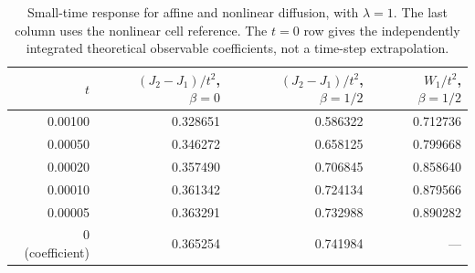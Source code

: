 \begin{table}[htbp]
\centering\small
\caption{Small-time response for affine and nonlinear diffusion, with $\lambda=1$. The last column uses the nonlinear cell reference. The $t=0$ row gives the independently integrated theoretical observable coefficients, not a time-step extrapolation.}\label{tab:response}
\begin{tabular}{@{}rrrr@{}}\toprule
$t$ & $(J_2-J_1)/t^2$, $\beta=0$ & $(J_2-J_1)/t^2$, $\beta=1/2$ & $W_1/t^2$, $\beta=1/2$ \\\midrule
0.00100 & 0.328651 & 0.586322 & 0.712736 \\
0.00050 & 0.346272 & 0.658125 & 0.799668 \\
0.00020 & 0.357490 & 0.706845 & 0.858640 \\
0.00010 & 0.361342 & 0.724134 & 0.879566 \\
0.00005 & 0.363291 & 0.732988 & 0.890282 \\
$0$ (coefficient) & 0.365254 & 0.741984 & --- \\
\bottomrule\end{tabular}
\end{table}
